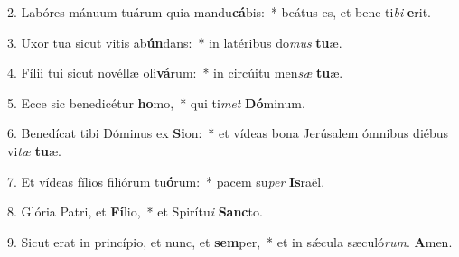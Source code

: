 2. Labóres mánuum tuárum quia mandu\textbf{cá}bis:~*  beátus es, et bene ti\textit{bi} \textbf{e}rit.\

3. Uxor tua sicut vitis ab\textbf{ún}dans:~*  in latéribus do\textit{mus} \textbf{tu}æ.\

4. Fílii tui sicut novéllæ oli\textbf{vá}rum:~*  in circúitu men\textit{sæ} \textbf{tu}æ.\

5. Ecce sic benedicétur \textbf{ho}mo,~*  qui ti\textit{met} \textbf{Dó}minum.\

6. Benedícat tibi Dóminus ex \textbf{Si}on:~*  et vídeas bona Jerúsalem ómnibus diébus vi\textit{tæ} \textbf{tu}æ.\

7. Et vídeas fílios filiórum tu\textbf{ó}rum:~*  pacem su\textit{per} \textbf{Is}raël.\

8. Glória Patri, et \textbf{Fí}lio,~*  et Spirítu\textit{i} \textbf{Sanc}to.\

9. Sicut erat in princípio, et nunc, et \textbf{sem}per,~*  et in sǽcula sæculó\textit{rum}. \textbf{A}men.\

